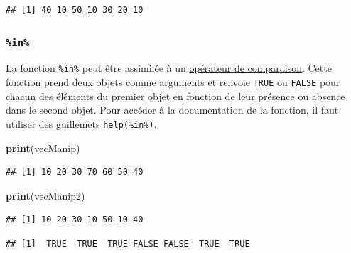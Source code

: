 \documentclass[]{book}
\newenvironment{Shaded}{\begin{snugshade}}{\end{snugshade}}
\newcommand{\KeywordTok}[1]{\textcolor[rgb]{0.13,0.29,0.53}{\textbf{#1}}}
\newcommand{\NormalTok}[1]{#1}
\newcommand{\OperatorTok}[1]{\textcolor[rgb]{0.81,0.36,0.00}{\textbf{#1}}}
\newcommand{\StringTok}[1]{\textcolor[rgb]{0.31,0.60,0.02}{#1}}
\begin{document}
\begin{verbatim}
## [1] 40 10 50 10 30 20 10
\end{verbatim}

\hypertarget{l015in}{%
\subsubsection{\texorpdfstring{\texttt{\%in\%}}{\%in\%}}\label{l015in}}

La fonction \texttt{\%in\%} peut être assimilée à un \protect\hyperlink{l011opcomp}{opérateur de comparaison}. Cette fonction prend deux objets comme arguments et renvoie \texttt{TRUE} ou \texttt{FALSE} pour chacun des éléments du premier objet en fonction de leur présence ou absence dans le second objet. Pour accéder à la documentation de la fonction, il faut utiliser des guillemets \texttt{help(\textquotesingle{}\%in\%\textquotesingle{})}.

\begin{Shaded}
\begin{Highlighting}[]
\KeywordTok{print}\NormalTok{(vecManip)}
\end{Highlighting}
\end{Shaded}

\begin{verbatim}
## [1] 10 20 30 70 60 50 40
\end{verbatim}

\begin{Shaded}
\begin{Highlighting}[]
\KeywordTok{print}\NormalTok{(vecManip2)}
\end{Highlighting}
\end{Shaded}

\begin{verbatim}
## [1] 10 20 30 10 50 10 40
\end{verbatim}

\begin{Shaded}
\end{Shaded}

\begin{verbatim}
## [1]  TRUE  TRUE  TRUE FALSE FALSE  TRUE  TRUE
\end{verbatim}

\begin{Shaded}
\end{Shaded}
\end{document}
